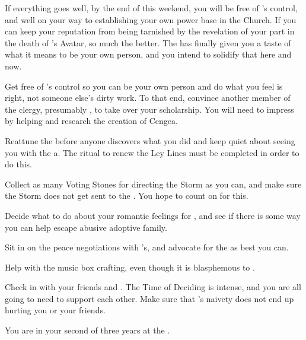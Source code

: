 \documentclass[char]{GL2020}
\begin{document}
If everything goes well, by the end of this weekend, you will be free of \cAntiChup{}'s control, and well on your way to establishing your own power base in the Church. If you can keep your reputation from being tarnished by the revelation of your part in the death of \cEbb{}'s Avatar, so much the better. The \pSchool{} has finally given you a taste of what it means to be your own person, and you intend to solidify that here and now.

\begin{itemz}
    \item Get free of \cAntiChup{}’s control so you can be your own person and do what you feel is right, not someone else’s dirty work. To that end, convince another member of the \pTech{} clergy, presumably \cBeetle{}, to take over your scholarship. You will need to impress \cBeetle{} by helping \cEbbPriest{} and \cHeadScientist{} research the creation of Cengea.
    \item Reattune the \iScythe{} before anyone discovers what you did and keep \cChupStudent{} quiet about \cChupStudent{\them}seeing you with the a\icScythe{}. The ritual to renew the Ley Lines must be completed in order to do this.
    \item Collect as many Voting Stones for directing the Storm as you can, and make sure the Storm does not get sent to the \pTech{}. You hope to count on \cHeadScientist{} for this.
   \item Decide what to do about your romantic feelings for \cAdopted{}, and see if there is some way you can help \cAdopted{\them} escape \cAdopted{\their} abusive adoptive family.
\end{itemz}

\begin{itemz}
    \item Sit in on the peace negotiations with \cAntiChup{}'s, and advocate for the \pTech{} as best you can.  
    \item Help \cAdopted{} with the music box \cAdopted{\theyare} crafting, even though it is blasphemous to \cFarmGod{}.
    \item Check in with your friends \cTechStar{} and \cAmbition{}. The Time of Deciding is intense, and you are all going to need to support each other. Make sure that \cPresident{}’s naivety does not end up hurting you or your friends.
\end{itemz}

\begin{itemz}[Notes]
    \item You are in your second of three years at the \pSchool{}.
\end{itemz}
\end{document}
